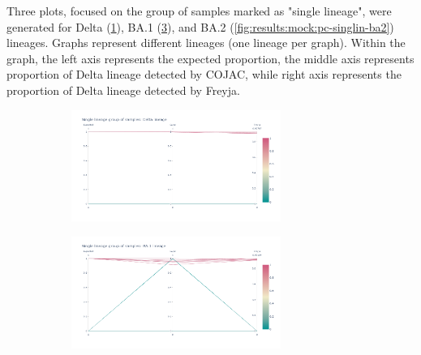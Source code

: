                 Three plots, focused on the group of samples marked as "single lineage", were generated for Delta (\cref{fig:results:mock:pc-singlin-delta}), BA.1 (\cref{fig:results:mock:pc-singlin-ba1}), and BA.2 (\cref{fig:results:mock:pc-singlin-ba2}) lineages. Graphs represent different lineages (one lineage per graph). Within the graph, the left axis represents the expected proportion, the middle axis represents proportion of Delta lineage detected by COJAC, while right axis represents the proportion of Delta lineage detected by Freyja.
                
                \begin{figure}[H]
                    \begin{subfigure}{\linewidth}
                	\centering
                    \includegraphics[width=0.75\textwidth]{figures/results/mock/pc-singlin-delta.png}
                    \label{fig:results:mock:pc-singlin-delta}
                    \end{subfigure}\par\medskip
                    \begin{subfigure}{\linewidth}
                	\centering
                    \includegraphics[width=0.75\textwidth]{figures/results/mock/pc-singlin-ba1.png}
                    \label{fig:results:mock:pc-singlin-ba1}
                    \end{subfigure}\par\medskip

\end{figure}
